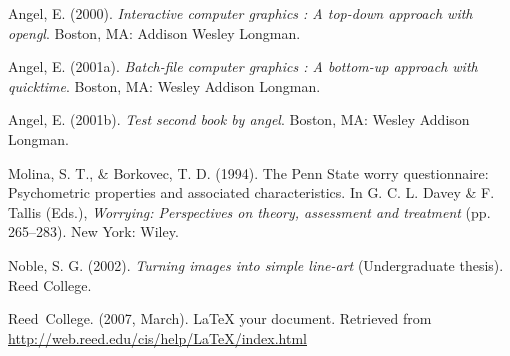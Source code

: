 \documentclass[12pt,twoside]{reedthesis}
\begin{document}
  \noindent
  
  \setlength{\parindent}{-0.20in} \setlength{\leftskip}{0.20in}
  \setlength{\parskip}{8pt}
  
  \hypertarget{refs}{}
  \hypertarget{ref-angel2000}{}
  Angel, E. (2000). \emph{Interactive computer graphics : A top-down
  approach with opengl}. Boston, MA: Addison Wesley Longman.
  
  \hypertarget{ref-angel2001}{}
  Angel, E. (2001a). \emph{Batch-file computer graphics : A bottom-up
  approach with quicktime}. Boston, MA: Wesley Addison Longman.
  
  \hypertarget{ref-angel2002a}{}
  Angel, E. (2001b). \emph{Test second book by angel}. Boston, MA: Wesley
  Addison Longman.
  
  \hypertarget{ref-Molina1994}{}
  Molina, S. T., \& Borkovec, T. D. (1994). The Penn State worry
  questionnaire: Psychometric properties and associated characteristics.
  In G. C. L. Davey \& F. Tallis (Eds.), \emph{Worrying: Perspectives on
  theory, assessment and treatment} (pp. 265--283). New York: Wiley.
  
  \hypertarget{ref-noble2002}{}
  Noble, S. G. (2002). \emph{Turning images into simple line-art}
  (Undergraduate thesis). Reed College.
  
  \hypertarget{ref-reedweb2007}{}
  Reed~College. (2007, March). LaTeX your document. Retrieved from
  \url{http://web.reed.edu/cis/help/LaTeX/index.html}


\end{document}
